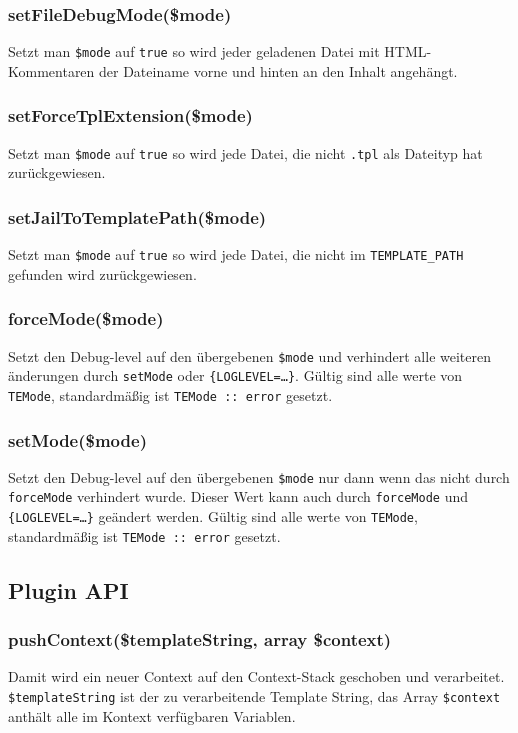 \documentclass[a4paper,10pt]{article}
\begin{document}
\subsubsection{setFileDebugMode(\$mode)}
Setzt man {\tt \$mode} auf {\tt true} so wird jeder geladenen Datei mit HTML-Kommentaren
der Dateiname vorne und hinten an den Inhalt angeh\"angt.

\subsubsection{setForceTplExtension(\$mode)}
Setzt man {\tt \$mode} auf {\tt true} so wird jede Datei, die nicht {\tt .tpl} als Dateityp
 hat zur\"uckgewiesen.

\subsubsection{setJailToTemplatePath(\$mode)}
Setzt man {\tt \$mode} auf {\tt true} so wird jede Datei, die nicht im {\tt TEMPLATE\_PATH}
 gefunden wird zur\"uckgewiesen.

\subsubsection{forceMode(\$mode)}
Setzt den Debug-level auf den \"ubergebenen {\tt \$mode} und verhindert alle weiteren
 \"anderungen durch {\tt setMode} oder {\tt \{LOGLEVEL=\dots\}}. G\"ultig sind alle werte
von {\tt TEMode}, standardm\"a\ss{}ig ist {\tt TEMode :: error} gesetzt.

\subsubsection{setMode(\$mode)}
Setzt den Debug-level auf den \"ubergebenen {\tt \$mode} nur dann wenn das nicht
 durch {\tt forceMode} verhindert wurde. Dieser Wert kann auch durch {\tt forceMode} und
 {\tt \{LOGLEVEL=\dots\}} ge\"andert werden.
G\"ultig sind alle werte von {\tt TEMode}, standardm\"a\ss{}ig ist {\tt TEMode :: error} gesetzt.


\subsection{Plugin API}

\subsubsection{pushContext(\$templateString, array \$context)}
Damit wird ein neuer Context auf den Context-Stack geschoben und verarbeitet.
{\tt \$templateString} ist der zu verarbeitende Template String, das Array {\tt \$context} anth\"alt alle im Kontext verf\"ugbaren Variablen.
\end{document}
